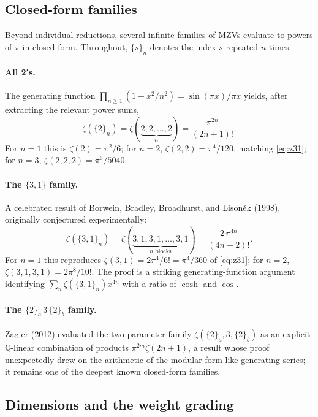 \documentclass[11pt]{article}
\theoremstyle{plain}
\theoremstyle{remark}
\begin{document}
\subsection*{Closed-form families}

Beyond individual reductions, several infinite families of MZVs evaluate to powers of $\pi$ in closed form. Throughout, $\{s\}_n$ denotes the index $s$ repeated $n$ times.

\paragraph{All 2's.} The generating function $\prod_{n\ge1}(1-x^2/n^2)=\sin(\pi x)/\pi x$ yields, after extracting the relevant power sums,
\begin{equation}
  \zeta(\{2\}_n)=\zeta(\underbrace{2,2,\dots,2}_{n})=\frac{\pi^{2n}}{(2n+1)!}.
  \label{eq:all2}
\end{equation}
For $n=1$ this is $\zeta(2)=\pi^2/6$; for $n=2$, $\zeta(2,2)=\pi^4/120$, matching \eqref{eq:z31}; for $n=3$, $\zeta(2,2,2)=\pi^6/5040$.

\paragraph{The $\{3,1\}$ family.} A celebrated result of Borwein, Bradley, Broadhurst, and Lison\v{e}k (1998), originally conjectured experimentally:
\begin{equation}
  \zeta(\{3,1\}_n)=\zeta(\underbrace{3,1,3,1,\dots,3,1}_{n\text{ blocks}})=\frac{2\,\pi^{4n}}{(4n+2)!}.
  \label{eq:bbbl31}
\end{equation}
For $n=1$ this reproduces $\zeta(3,1)=2\pi^4/6!=\pi^4/360$ of \eqref{eq:z31}; for $n=2$, $\zeta(3,1,3,1)=2\pi^8/10!$. The proof is a striking generating-function argument identifying $\sum_n\zeta(\{3,1\}_n)x^{4n}$ with a ratio of $\cosh$ and $\cos$.

\paragraph{The $\{2\}_a\,3\,\{2\}_b$ family.} Zagier (2012) evaluated the two-parameter family $\zeta(\{2\}_a,3,\{2\}_b)$ as an explicit $\mathbb{Q}$-linear combination of products $\pi^{2m}\zeta(2n+1)$, a result whose proof unexpectedly drew on the arithmetic of the modular-form-like generating series; it remains one of the deepest known closed-form families.

\subsection*{Dimensions and the weight grading}
\end{document}
